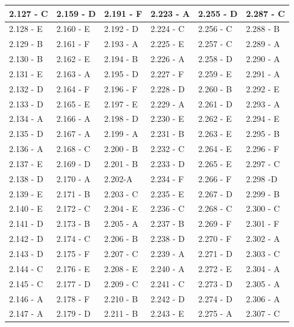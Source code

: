 \documentclass[10pt]{article}
\begin{document}
\begin{center}
\begin{tabular}{|l|l|l|l|l|l|}
\hline
2.127 - C & 2.159 - D & 2.191 - F & 2.223 - A & 2.255 - D & 2.287 - C \\
\hline
2.128 - E & 2.160 - E & 2.192 - D & 2.224 - C & 2.256 - C & 2.288 - B \\
\hline
2.129 - B & 2.161 - F & 2.193 - A & 2.225 - E & 2.257 - C & 2.289 - A \\
\hline
2.130 - B & 2.162 - E & 2.194 - B & 2.226 - A & 2.258 - D & 2.290 - A \\
\hline
2.131 - E & 2.163 - A & 2.195 - D & 2.227 - F & 2.259 - E & 2.291 - A \\
\hline
2.132 - D & 2.164 - F & 2.196 - F & 2.228 - D & 2.260 - B & 2.292 - E \\
\hline
2.133 - D & 2.165 - E & 2.197 - E & 2.229 - A & 2.261 - D & 2.293 - A \\
\hline
2.134 - A & 2.166 - A & 2.198 - D & 2.230 - E & 2.262 - E & 2.294 - E \\
\hline
2.135 - D & 2.167 - A & 2.199 - A & 2.231 - B & 2.263 - E & 2.295 - B \\
\hline
2.136 - A & 2.168 - C & 2.200 - B & 2.232 - C & 2.264 - E & 2.296 - F \\
\hline
2.137 - E & 2.169 - D & 2.201 - B & 2.233 - D & 2.265 - E & 2.297 - C \\
\hline
2.138 - D & 2.170 - A & 2.202-A & 2.234 - F & 2.266 - F & 2.298 -D \\
\hline
2.139 - E & 2.171 - B & 2.203 - C & 2.235 - E & 2.267 - D & 2.299 - B \\
\hline
2.140 - E & 2.172 - C & 2.204 - E & 2.236 - C & 2.268 - C & 2.300 - C \\
\hline
2.141 - D & 2.173 - B & 2.205 - A & 2.237 - B & 2.269 - F & 2.301 - F \\
\hline
2.142 - D & 2.174 - C & 2.206 - B & 2.238 - D & 2.270 - F & 2.302 - A \\
\hline
2.143 - D & 2.175 - F & 2.207 - C & 2.239 - A & 2.271 - D & 2.303 - C \\
\hline
2.144 - C & 2.176 - E & 2.208 - E & 2.240 - A & 2.272 - E & 2.304 - A \\
\hline
2.145 - C & 2.177 - D & 2.209 - C & 2.241 - C & 2.273 - D & 2.305 - A \\
\hline
2.146 - A & 2.178 - F & 2.210 - B & 2.242 - D & 2.274 - D & 2.306 - A \\
\hline
2.147 - A & 2.179 - D & 2.211 - B & 2.243 - E & 2.275 - A & 2.307 - C \\

\end{tabular}
\end{center}
\end{document}
